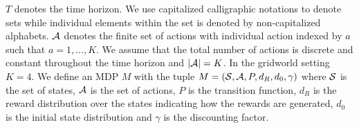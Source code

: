 $T$ denotes the time horizon. We use capitalized calligraphic notations to denote sets while individual elements within the set is denoted by non-capitalized alphabets. $\A$ denotes the finite set of actions  with individual action indexed by $a$ such that $a=1,\ldots, K$. We assume that the total number of actions is discrete and constant throughout the time horizon and $|\A|=K$. In the gridworld setting $K=4$. We define an MDP $M$ with the tuple $M  = (\S,\A,P,d_R, d_0,\gamma)$ where $\S$ is the set of states, $\A$ is the set of actions, $P$ is the transition function, $d_R$ is the reward distribution over the states indicating how the rewards are generated, $d_0$ is the initial state distribution and $\gamma$ is the discounting factor.